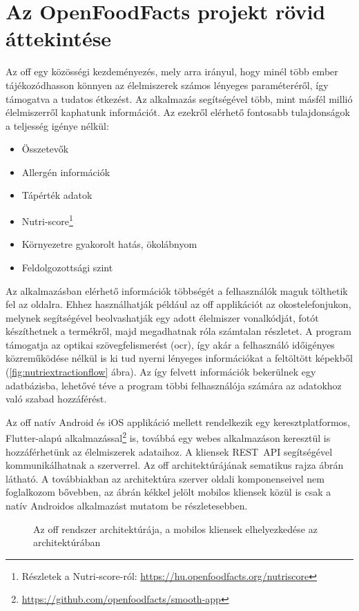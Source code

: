 \chapter{Az OpenFoodFacts projekt rövid áttekintése}

Az \acrlong{off} egy közösségi kezdeményezés, mely arra irányul, hogy minél több ember
tájékozódhasson könnyen az élelmiszerek számos lényeges paraméteréről, így támogatva a
tudatos étkezést. Az alkalmazás segítségével több, mint másfél millió élelmiszerről kaphatunk
információt. Az ezekről elérhető fontosabb tulajdonságok a teljesség igénye nélkül:
\begin{itemize}
 \item Összetevők
 \item Allergén információk
 \item Tápérték adatok
 \item Nutri-score\footnote{Részletek a Nutri-score-ról: \url{https://hu.openfoodfacts.org/nutriscore}}
 \item Környezetre gyakorolt hatás, ökolábnyom
 \item Feldolgozottsági szint
\end{itemize}


Az alkalmazásban elérhető információk többségét a felhasználók maguk tölthetik fel az oldalra.
Ehhez használhatják például az \acrlong{off} applikációt az okostelefonjukon, melynek segítségével
beolvashatják egy adott élelmiszer vonalkódját, fotót készíthetnek a termékről, majd megadhatnak róla számtalan
részletet. A program támogatja az optikai szövegfelismerést (\acrfull{ocr}),
így akár a felhasználó időigényes közreműködése nélkül is ki tud nyerni lényeges információkat a
feltöltött képekből (\ref{fig:nutriextractionflow} ábra). Az így felvett információk bekerülnek egy adatbázisba, lehetővé téve a program többi
felhasználója számára az adatokhoz való szabad hozzáférést.

Az \acrlong{off} natív Android és iOS applikáció mellett rendelkezik egy keresztplatformos,
Flutter-alapú alkalmazással\footnote{\url{https://github.com/openfoodfacts/smooth-app}} is, továbbá egy webes alkalmazáson keresztül is hozzáférhetünk az
élelmiszerek adataihoz. A kliensek REST~API segítségével kommunikálhatnak a %
szerverrel. Az \acrlong{off} architektúrájának sematikus rajza \az{\ref{fig:offarchitektura}}
ábrán látható. A továbbiakban az architektúra szerver oldali komponenseivel nem foglalkozom bővebben, az
ábrán kékkel jelölt mobilos kliensek közül is csak a natív Androidos alkalmazást mutatom be részletesebben.

\begin{figure}[ht]
\centering

\caption{\centering Az \acrlong{off} rendszer architektúrája, a mobilos kliensek elhelyezkedése az architektúrában}
\label{fig:offarchitektura}
\end{figure}
